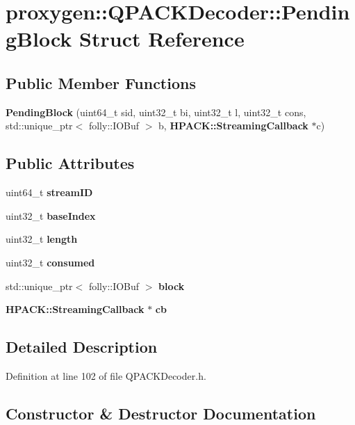 \section{proxygen\+:\+:Q\+P\+A\+C\+K\+Decoder\+:\+:Pending\+Block Struct Reference}
\label{structproxygen_1_1QPACKDecoder_1_1PendingBlock}
\subsection*{Public Member Functions}
\begin{DoxyCompactItemize}
\item 
{\bf Pending\+Block} (uint64\+\_\+t sid, uint32\+\_\+t bi, uint32\+\_\+t l, uint32\+\_\+t cons, std\+::unique\+\_\+ptr$<$ folly\+::\+I\+O\+Buf $>$ b, {\bf H\+P\+A\+C\+K\+::\+Streaming\+Callback} $\ast$c)
\end{DoxyCompactItemize}
\subsection*{Public Attributes}
\begin{DoxyCompactItemize}
\item 
uint64\+\_\+t {\bf stream\+ID}
\item 
uint32\+\_\+t {\bf base\+Index}
\item 
uint32\+\_\+t {\bf length}
\item 
uint32\+\_\+t {\bf consumed}
\item 
std\+::unique\+\_\+ptr$<$ folly\+::\+I\+O\+Buf $>$ {\bf block}
\item 
{\bf H\+P\+A\+C\+K\+::\+Streaming\+Callback} $\ast$ {\bf cb}
\end{DoxyCompactItemize}


\subsection{Detailed Description}


Definition at line 102 of file Q\+P\+A\+C\+K\+Decoder.\+h.



\subsection{Constructor \& Destructor Documentation}
